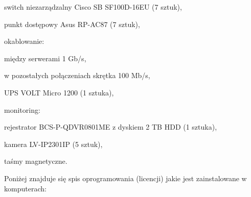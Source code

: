 \begin{minipage}{13.5cm}
\begin{itemize*}
	\item switch niezarządzalny Cisco SB SF100D-16EU (7 sztuk),
	\item punkt dostępowy Asus RP-AC87 (7 sztuk),
	\item okablowanie:
	\begin{itemize*}
		\item między serwerami 1 Gb/s,
		\item w pozostałych połączeniach skrętka 100 Mb/s,
	\end{itemize*}
	\item UPS VOLT Micro 1200 (1 sztuka),
	\item monitoring:
	\begin{itemize*}
		\item rejestrator BCS-P-QDVR0801ME z dyskiem 2 TB HDD (1 sztuka),
		\item kamera LV-IP2301IP (5 sztuk),
	\end{itemize*}
	\item taśmy magnetyczne.
\end{itemize*}
\end{minipage}

\newpage
Poniżej znajduje się spis oprogramowania (licencji) jakie jest \linebreak zainstalowane w komputerach:

